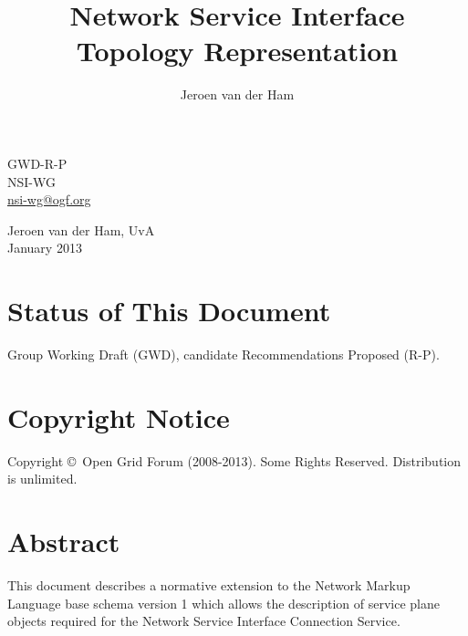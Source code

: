 \documentclass[12pt]{article}  %
\title{Network Service Interface Topology Representation}
\author{Jeroen van der Ham}
\newcommand{\headerstyle}{\sffamily} %
\newcommand{\ifnonempty}[2]{\ifthenelse{\isundefined{#1}}{}{\ifthenelse{\equal{#1}{}}{}{#2}}}
\newcommand{\authorsshort}{Jeroen van der Ham, UvA}
\newcommand{\publicationdate}{January 2013}  %
\newcommand{\copyrightyears}{2008-2013}  %
\newcommand{\docseries}{GWD-R-P}  %
\begin{document}
{\noindent
\begin{minipage}[t]{1.5in}
\headerstyle
\docseries \\
NSI-WG \\
\href{mailto:nsi-wg@ogf.org}{nsi-wg@ogf.org}
\end{minipage}
\hfill
\raggedleft
\begin{minipage}[t]{4.5in}
\raggedleft
\headerstyle
\authorsshort \\
\vspace{1em}
\publicationdate \\
\ifnonempty{\revisiondate}{Revised \revisiondate \\}
\end{minipage}
}

\vspace{1em}
\begin{center}
\makeatletter
\Large\bf\textsf \@title
\makeatother
\end{center}


\section*{Status of This Document}

Group Working Draft (GWD), candidate Recommendations Proposed (R-P).


% 

\section*{Copyright Notice}

Copyright \copyright \ Open Grid Forum (\copyrightyears).  Some Rights Reserved.  
Distribution is unlimited.

\section*{Abstract}

This document describes a normative extension to the Network Markup Language base schema version 1 
which allows the description of service plane objects required for the Network Service Interface
Connection Service.
\end{document}
